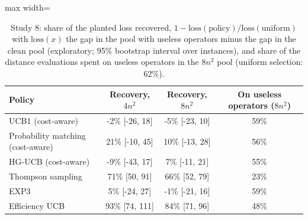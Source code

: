 \begin{table}[t]
\caption{Study 8: share of the planted loss recovered, $1-\mathrm{loss}(\text{policy})/\mathrm{loss}(\text{uniform})$ with $\mathrm{loss}(x)$ the gap in the pool with useless operators minus the gap in the clean pool (exploratory; 95\% bootstrap interval over instances), and share of the distance evaluations spent on useless operators in the $8n^2$ pool (uniform selection: 62\%).}\label{tab:s8rec}
\centering
\small
\begin{adjustbox}{max width=\linewidth}
\begin{tabular}{lccc}
\toprule
Policy & Recovery, $4n^2$ & Recovery, $8n^2$ & On useless operators ($8n^2$) \\
\midrule
UCB1 (cost-aware) & -2\% [-26, 18] & -5\% [-23, 10] & 59\% \\
Probability matching (cost-aware) & 21\% [-10, 45] & 10\% [-13, 28] & 56\% \\
HG-UCB (cost-aware) & -9\% [-43, 17] & 7\% [-11, 21] & 55\% \\
Thompson sampling & 71\% [50, 91] & 66\% [52, 79] & 23\% \\
EXP3 & 5\% [-24, 27] & -1\% [-21, 16] & 59\% \\
Efficiency UCB & 93\% [74, 111] & 84\% [71, 96] & 48\% \\
\bottomrule
\end{tabular}
\end{adjustbox}
\end{table}
